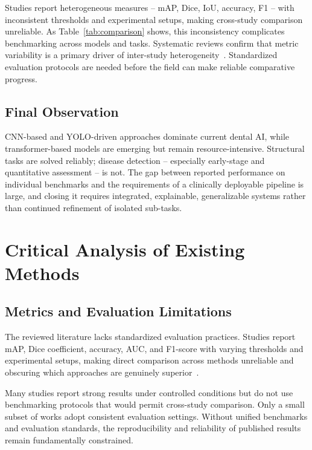 \documentclass[conference]{IEEEtran}
\begin{document}
Studies report heterogeneous measures -- mAP, Dice, IoU, accuracy, F1
-- with inconsistent thresholds and experimental setups, making
cross-study comparison unreliable. As Table~\ref{tab:comparison} shows,
this inconsistency complicates benchmarking across models and tasks.
Systematic reviews confirm that metric variability is a primary driver
of inter-study heterogeneity~\cite{bonfanti2025deep}. Standardized
evaluation protocols are needed before the field can make reliable
comparative progress.

\subsection{Final Observation}

CNN-based and YOLO-driven approaches dominate current dental AI, while
transformer-based models are emerging but remain resource-intensive.
Structural tasks are solved reliably; disease detection -- especially
early-stage and quantitative assessment -- is not. The gap between
reported performance on individual benchmarks and the requirements of a
clinically deployable pipeline is large, and closing it requires
integrated, explainable, generalizable systems rather than continued
refinement of isolated sub-tasks.

\section{Critical Analysis of Existing Methods}
\label{sec:critical}

\subsection{Metrics and Evaluation Limitations}

The reviewed literature lacks standardized evaluation practices. Studies
report mAP, Dice coefficient, accuracy, AUC, and F1-score with varying
thresholds and experimental setups, making direct comparison across
methods unreliable and obscuring which approaches are genuinely
superior~\cite{iacob2025automated,bonfanti2025deep,khubrani2025detection}.

Many studies report strong results under controlled conditions but do
not use benchmarking protocols that would permit cross-study comparison.
Only a small subset of works adopt consistent evaluation settings.
Without unified benchmarks and evaluation standards, the reproducibility
and reliability of published results remain fundamentally constrained.
\end{document}
